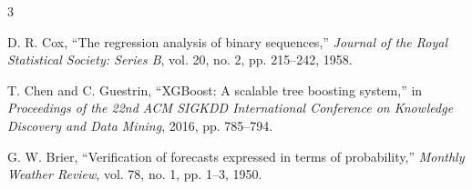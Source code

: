 \documentclass[conference]{IEEEtran}
\begin{document}
\begin{thebibliography}{3}

D. R. Cox, ``The regression analysis of binary sequences,''
\textit{Journal of the Royal Statistical Society: Series B},
vol. 20, no. 2, pp. 215--242, 1958.

T. Chen and C. Guestrin, ``XGBoost: A scalable tree boosting system,''
in \textit{Proceedings of the 22nd ACM SIGKDD International
Conference on Knowledge Discovery and Data Mining}, 2016,
pp. 785--794.

G. W. Brier, ``Verification of forecasts expressed in terms of
probability,'' \textit{Monthly Weather Review}, vol. 78, no. 1,
pp. 1--3, 1950.

\end{thebibliography}
\end{document}
